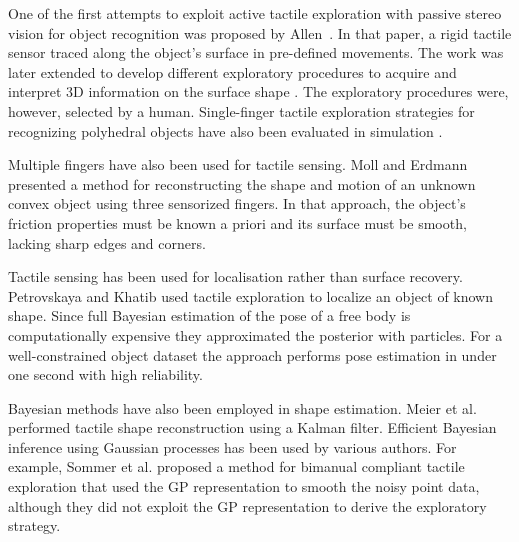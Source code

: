 
One of the first attempts to exploit active tactile exploration with passive stereo vision for object recognition was proposed by Allen~\cite{Allen1987Robotic}. In that paper, a rigid tactile sensor traced along the object's surface in pre-defined movements. The work was later extended to develop different exploratory procedures to acquire and interpret 3D information on the surface shape \cite{Allen1990Acquisition}. The exploratory procedures were, however, selected by a human. Single-finger tactile exploration strategies for recognizing polyhedral objects have also been evaluated in simulation \cite{Roberts1990ICRA,Caselli1996ICRA}. 

Multiple fingers have also been used for tactile sensing. Moll and Erdmann~\cite{Moll2003STAR} presented a method for reconstructing the shape and motion of an unknown convex object using three sensorized fingers. In that approach, the object's friction properties must be known a priori and its surface must be smooth, lacking sharp edges and corners.


Tactile sensing has been used for localisation rather than surface recovery. Petrovskaya and Khatib \cite{Petrovskaya2011Global} used tactile exploration to localize an object of known shape. Since full Bayesian estimation of the pose of a free body is computationally expensive they approximated the posterior with particles. For a well-constrained object dataset the approach performs pose estimation in under one second with high reliability.

Bayesian methods have also been employed in shape estimation. Meier et al.\cite{Meier2011Probabilistic} performed tactile shape reconstruction using a Kalman filter. Efficient Bayesian inference using Gaussian processes has been used by various authors. For example, Sommer et al. \cite{Sommer2014Bimanual} proposed a method for bimanual compliant tactile exploration that used the GP representation to smooth the noisy point data, although they did not exploit the GP representation to derive the exploratory strategy.

